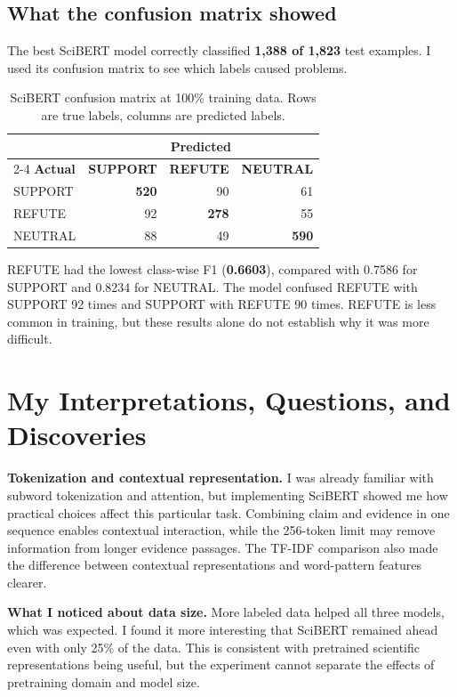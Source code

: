 \documentclass[11pt,letterpaper]{article}
\begin{document}
\subsection{What the confusion matrix showed}
The best SciBERT model correctly classified \textbf{1,388 of 1,823} test examples. I used its confusion matrix to see which labels caused problems.

\begin{table}[H]
\centering\small
\caption{SciBERT confusion matrix at 100\% training data. Rows are true labels, columns are predicted labels.}
\begin{tabular}{@{}lrrr@{}}\toprule
 & \multicolumn{3}{c}{\textbf{Predicted}}\\\cmidrule(l){2-4}
\textbf{Actual} & \textbf{SUPPORT} & \textbf{REFUTE} & \textbf{NEUTRAL}\\\midrule
SUPPORT & \textbf{520} & 90 & 61\\
REFUTE & 92 & \textbf{278} & 55\\
NEUTRAL & 88 & 49 & \textbf{590}\\\bottomrule
\end{tabular}
\end{table}

REFUTE had the lowest class-wise F1 (\textbf{0.6603}), compared with 0.7586 for SUPPORT and 0.8234 for NEUTRAL. The model confused REFUTE with SUPPORT 92 times and SUPPORT with REFUTE 90 times. REFUTE is less common in training, but these results alone do not establish why it was more difficult.

\section{My Interpretations, Questions, and Discoveries}

\textbf{Tokenization and contextual representation.} I was already familiar with subword tokenization and attention, but implementing SciBERT showed me how practical choices affect this particular task. Combining claim and evidence in one sequence enables contextual interaction, while the 256-token limit may remove information from longer evidence passages. The TF-IDF comparison also made the difference between contextual representations and word-pattern features clearer.

\textbf{What I noticed about data size.} More labeled data helped all three models, which was expected. I found it more interesting that SciBERT remained ahead even with only 25\% of the data. This is consistent with pretrained scientific representations being useful, but the experiment cannot separate the effects of pretraining domain and model size.
\end{document}
